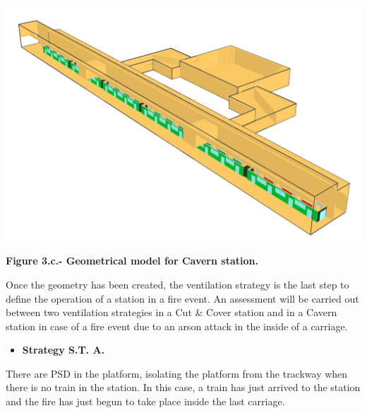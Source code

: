 \documentclass{article}
\begin{document}
\begin{mdcenter}%

\noindent{}\includegraphics[keepaspectratio=true,width=\dimmin{}{\dimwidth{0.45}}]{images/Fig-3.c}{}%
\end{mdcenter}%

\begin{mdcenter}%

\noindent{}\textbf{Figure 3.c.- Geometrical model for Cavern station.}%
\end{mdcenter}%

\noindent{}Once the geometry has been created, the ventilation strategy is the last step 
to define the operation of a station in a fire event. An assessment will be 
carried out between two ventilation strategies in a Cut \& Cover station and in a 
Cavern station in case of a fire event due to an arson attack in the inside of a 
carriage.%

\begin{itemize}[noitemsep,topsep=\mdcompacttopsep]%

\item{}\textbf{Strategy S.T. A.}%
\end{itemize}%

\noindent{}There are PSD in the platform, isolating the platform from the trackway when 
there is no train in the station. In this case, a train has just arrived to 
the station and the fire has just begun to take place inside the last carriage.%
\end{document}
